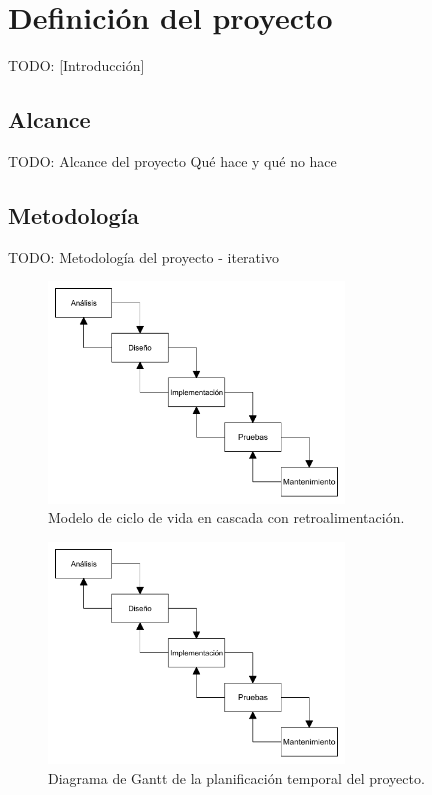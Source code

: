 \chapter{Definición del proyecto\label{cap:defProyecto}}

TODO: [Introducción]

\section{Alcance\label{sec:dp:alcance}}

TODO: Alcance del proyecto
Qué hace y qué no hace


\section{Metodología\label{sec:dp:metodologia}}

TODO: Metodología del proyecto - iterativo

\begin{figure}[!htp]
  \centering
  \includegraphics[width=0.7\textwidth,clip=true]{graphics/cascada_retroalimentacion}
  \caption{Modelo de ciclo de vida en cascada con retroalimentación.}
  \label{fig:cascada}
\end{figure}

\begin{figure}[!htp]
  \centering
  \includegraphics[width=0.7\textwidth,clip=true]{graphics/cascada_retroalimentacion}
  \caption{Diagrama de Gantt de la planificación temporal del proyecto.}
  \label{fig:gantt}
\end{figure} 

